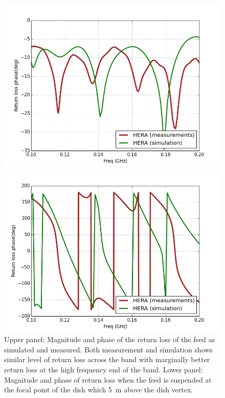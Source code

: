 \documentclass[twocolumn]{emulateapj}
\begin{document}
\begin{figure}[ht]
\begin{minipage}[b]{0.5\linewidth}
    \centering
    \includegraphics[angle=0, width=\linewidth]{GB_reflectometry_part3/plot/RL_mag_dish.png}
    \end{minipage}
    \hspace{0.1cm}
    \begin{minipage}[b]{0.5\linewidth}
    \centering
    \includegraphics[angle=0, width=\linewidth]{GB_reflectometry_part3/plot/RL_ph_HERA.png}
    \end{minipage}
    \caption{Upper panel: Magnitude and phase of the return loss of the feed as simulated and measured. Both measurement and simulation shows similar level of return loss across the band with marginally better return loss at the high frequency end of the band. Lower panel: Magnitude and phase of return loss when the feed is suspended at the focal point of the dish which 5~m above the dish vertex.}   
    \label{RL_mag_dish}
    \end{figure}
    
\end{document}
